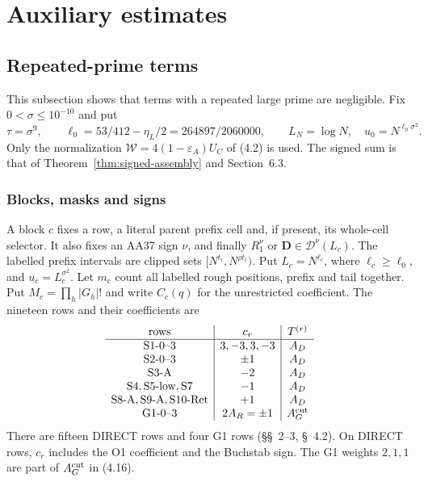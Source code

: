 \section{Auxiliary estimates}

\subsection{Repeated-prime terms}

This subsection shows that terms with a repeated large prime are negligible.
Fix $0<\sigma\le10^{-10}$ and put
\[
 \tau=\sigma^9,\qquad
 \ell_0=53/412-\eta_L/2=264897/2060000,\qquad
 L_N=\log N,\quad u_0=N^{\ell_0\sigma^2}.
\]
Only the normalization $\mathcal W=4(1-\varepsilon_A)U_C$ of (4.2) is used.
The signed sum is that of Theorem~\ref{thm:signed-assembly} and Section~6.3.

\subsubsection*{Blocks, masks and signs}

A block $c$ fixes a row, a literal parent prefix cell
and, if present, its whole-cell selector.
It also fixes an AA37 sign $\nu$,
and finally $R_1^\nu$ or $\mathbf D\in\mathcal D^\nu(L_c)$.
The labelled prefix intervals are clipped sets $[N^{t_i},N^{\rho t_i})$.
Put $L_c=N^{\ell_c}$, where $\ell_c\ge\ell_0$, and $u_c=L_c^{\sigma^2}$.
Let $m_c$ count all labelled rough positions, prefix and tail together.
Put $M_c=\prod_h|G_h|!$ and write $C_c(q)$ for the unrestricted coefficient.
The nineteen rows and their coefficients are
\[
\begin{array}{c|c|c}
 \text{rows}&c_r&T^{(r)}\\ \hline
 \mathrm{S1\hbox{-}0\hbox{--}3}&3,-3,3,-3&A_D\\
 \mathrm{S2\hbox{-}0\hbox{--}3}&\pm1&A_D\\
 \mathrm{S3\hbox{-}A}&-2&A_D\\
 \mathrm{S4,S5\hbox{-}low,S7}&-1&A_D\\
 \mathrm{S8\hbox{-}A,S9\hbox{-}A,S10\hbox{-}Ret}&+1&A_D\\
 \mathrm{G1\hbox{-}0\hbox{--}3}&2A_R=\pm1&A_G^{\rm cut}
\end{array}
\]
There are fifteen DIRECT rows and four G1 rows (\S\S~2--3, \S~4.2).
On DIRECT rows, $c_r$ includes the O1 coefficient and the Buchstab sign.
The G1 weights $2,1,1$ are part of $A_G^{\rm cut}$ in (4.16).

